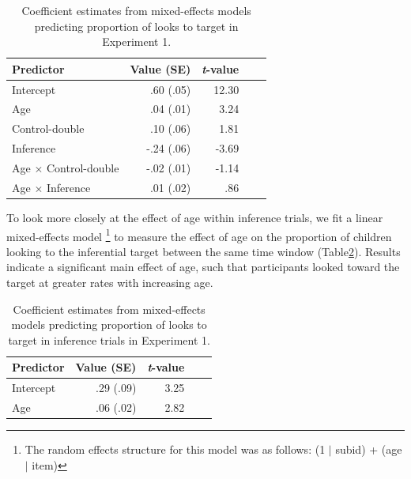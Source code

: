 \documentclass[10pt,letterpaper]{article}
\begin{document}
\begin{table}[b!]
\caption{\label{tab:lmer1}  Coefficient estimates from mixed-effects models predicting proportion of looks to target in Experiment 1.} 
\begin{center} 
\begin{tabular}{l r r r l} 
\hline
Predictor  &  Value (SE) & \emph{t}-value\\
\hline
Intercept  & .60 (.05) & 12.30 \\
Age & .04 (.01) &  3.24 \\
Control-double & .10 (.06) & 1.81 \\
Inference & -.24 (.06) & -3.69 \\
Age $\times$ Control-double & -.02 (.01) & -1.14 \\
Age $\times$ Inference & .01 (.02) & .86 \\
\hline
\end{tabular} 
\end{center} 
\end{table}

To look more closely at the effect of age within inference trials, we fit a linear mixed-effects model \footnote{The random effects structure for this model was as follows: (1 $|$ subid) + (age $|$ item)} to measure the effect of age on the proportion of children looking to the inferential target between the same time window (Table\ref{tab:lmer2}). Results indicate a significant main effect of age, such that participants looked toward the target at greater rates with increasing age.

\begin{table}[b!]
\caption{\label{tab:lmer2}  Coefficient estimates from mixed-effects models predicting proportion of looks to target in inference trials in Experiment 1.} 
\begin{center} 
\begin{tabular}{l r r r l} 
\hline
Predictor  &  Value (SE) & \emph{t}-value\\
\hline
Intercept  & .29 (.09) & 3.25 \\
Age & .06 (.02) &  2.82 \\
\hline
\end{tabular} 
\end{center} 
\end{table}
\end{document}
